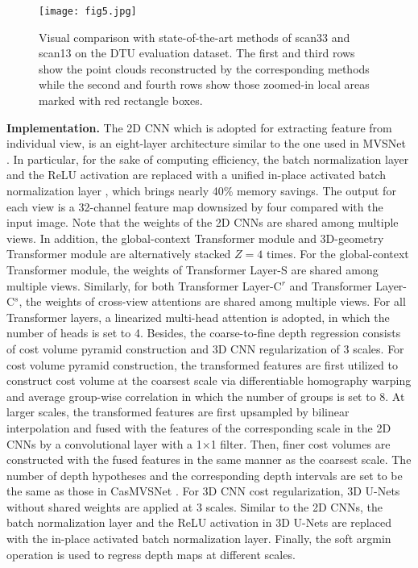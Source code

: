 \documentclass[10pt,twocolumn,letterpaper]{article}
\begin{document}
\begin{figure*}[!t]
	\centering
	\texttt{[image: fig5.jpg]}
	\caption{Visual comparison with state-of-the-art methods \cite{rmvsnet,ucsnet,patchmatchnet} of scan33 and scan13 on the DTU evaluation dataset. The first and third rows show the point clouds reconstructed by the corresponding methods while the second and fourth rows show those zoomed-in local areas marked with red rectangle boxes.}
	\label{fig.5}
	\vspace{0.2cm}
\end{figure*}

{\bf{Implementation.}} The 2D CNN which is adopted for extracting feature from individual view, is an eight-layer architecture similar to the one used in MVSNet \cite{mvsnet}. In particular, for the sake of computing efficiency, the batch normalization layer and the ReLU activation are replaced with a unified in-place activated batch normalization layer \cite{inplace-abn}, which brings nearly 40\% memory savings. The output for each view is a 32-channel feature map downsized by four compared with the input image. Note that the weights of the 2D CNNs are shared among multiple views. In addition, the global-context Transformer module and 3D-geometry Transformer module are alternatively stacked $Z=4$ times. For the global-context Transformer module, the weights of Transformer Layer-S are shared among multiple views. Similarly, for both Transformer Layer-C$^{r}$ and Transformer Layer-C$^{s}$, the weights of cross-view attentions are shared among multiple views. For all Transformer layers, a linearized multi-head attention \cite{lineartransformer} is adopted, in which the number of heads is set to 4. Besides, the coarse-to-fine depth regression consists of cost volume pyramid construction and 3D CNN regularization of 3 scales. For cost volume pyramid construction, the transformed features are first utilized to construct cost volume at the coarsest scale via differentiable homography warping \cite{mvsnet} and average group-wise correlation \cite{cider} in which the number of groups is set to 8. At larger scales, the transformed features are first upsampled by bilinear interpolation and fused with the features of the corresponding scale in the 2D CNNs by a convolutional layer with a 1×1 filter. Then, finer cost volumes are constructed with the fused features in the same manner as the coarsest scale. The number of depth hypotheses and the corresponding depth intervals are set to be the same as those in CasMVSNet \cite{casmvsnet}. For 3D CNN cost regularization, 3D U-Nets \cite{unet} without shared weights are applied at 3 scales. Similar to the 2D CNNs, the batch normalization layer and the ReLU activation in 3D U-Nets are replaced with the in-place activated batch normalization layer. Finally, the soft argmin operation \cite{softargmin} is used to regress depth maps at different scales.
\end{document}
